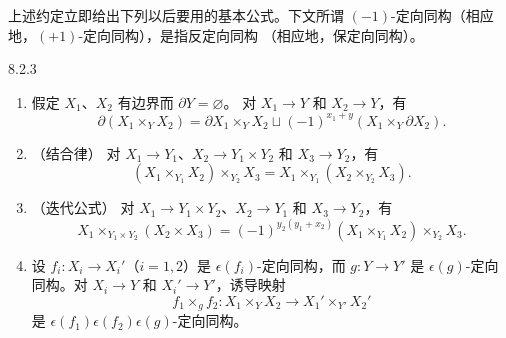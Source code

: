 上述约定立即给出下列以后要用的基本公式。下文所谓
$(-1)$-定向同构（相应地，$(+1)$-定向同构），是指反定向同构
（相应地，保定向同构）。

\begin{lemma}{8.2.3}\label{lem:8-2-3}
\begin{enumerate}[label=(\arabic*),leftmargin=2.8em]
\item 假定 $X_1$、$X_2$ 有边界而 $\partial Y=\varnothing$。
对 $X_1\to Y$ 和 $X_2\to Y$，有
\[
 \partial(X_1\times_YX_2)
 =\partial X_1\times_YX_2
 \mathbin{\sqcup}(-1)^{x_1+y}(X_1\times_Y\partial X_2).
\]

\item \textup{（结合律）}
对 $X_1\to Y_1$、$X_2\to Y_1\times Y_2$ 和 $X_3\to Y_2$，有
\[
 (X_1\times_{Y_1}X_2)\times_{Y_2}X_3
 =X_1\times_{Y_1}(X_2\times_{Y_2}X_3).
\]

\item \textup{（迭代公式）}
对 $X_1\to Y_1\times Y_2$、$X_2\to Y_1$ 和 $X_3\to Y_2$，有
\[
 X_1\times_{Y_1\times Y_2}(X_2\times X_3)
 =(-1)^{y_2(y_1+x_2)}
 (X_1\times_{Y_1}X_2)\times_{Y_2}X_3.
\]

\item 设 $f_i\colon X_i\to X_i'$（$i=1,2$）是
$\epsilon(f_i)$-定向同构，而 $g\colon Y\to Y'$ 是
$\epsilon(g)$-定向同构。对 $X_i\to Y$ 和 $X_i'\to Y'$，诱导映射
\[
 f_1\times_gf_2\colon X_1\times_YX_2
 \longrightarrow X_1'\times_{Y'}X_2'
\]
是 $\epsilon(f_1)\epsilon(f_2)\epsilon(g)$-定向同构。
\end{enumerate}
\end{lemma}

